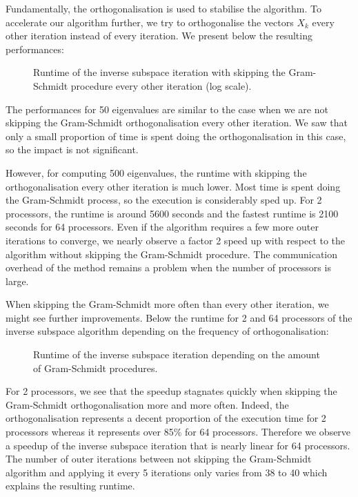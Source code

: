 Fundamentally, the orthogonalisation is used to stabilise the algorithm.
To accelerate our algorithm further, we try to orthogonalise the vectors \(X_k\) every other iteration instead of every iteration.
We present below the resulting performances:

\begin{figure}[H]
  \centering
  
  \caption{Runtime of the inverse subspace iteration with skipping the Gram-Schmidt procedure every other iteration (log scale).}
\end{figure}

The performances for 50 eigenvalues are similar to the case when we are not skipping the Gram-Schmidt orthogonalisation every other iteration.
We saw that only a small proportion of time is spent doing the orthogonalisation in this case, so the impact is not significant.

However, for computing 500 eigenvalues, the runtime with skipping the orthogonalisation every other iteration is much lower.
Most time is spent doing the Gram-Schmidt process, so the execution is considerably sped up.
For 2 processors, the runtime is around 5600 seconds and the fastest runtime is 2100 seconds for 64 processors.
Even if the algorithm requires a few more outer iterations to converge, we nearly observe a factor 2 speed up with respect to the algorithm without skipping the Gram-Schmidt procedure.
The communication overhead of the method remains a problem when the number of processors is large.

When skipping the Gram-Schmidt more often than every other iteration, we might see further improvements.
Below the runtime for 2 and 64 processors of the inverse subspace algorithm depending on the frequency of orthogonalisation:

\begin{figure}[H]
  \centering
  
  \caption{Runtime of the inverse subspace iteration depending on the amount of Gram-Schmidt procedures.}
\end{figure}

For 2 processors, we see that the speedup stagnates quickly when skipping the Gram-Schmidt orthogonalisation more and more often.
Indeed, the orthogonalisation represents a decent proportion of the execution time for 2 processors whereas it represents over 85\% for 64 processors.
Therefore we observe a speedup of the inverse subspace iteration that is nearly linear for 64 processors.
The number of outer iterations between not skipping the Gram-Schmidt algorithm and applying it every 5 iterations only varies from 38 to 40 which explains the resulting runtime.
